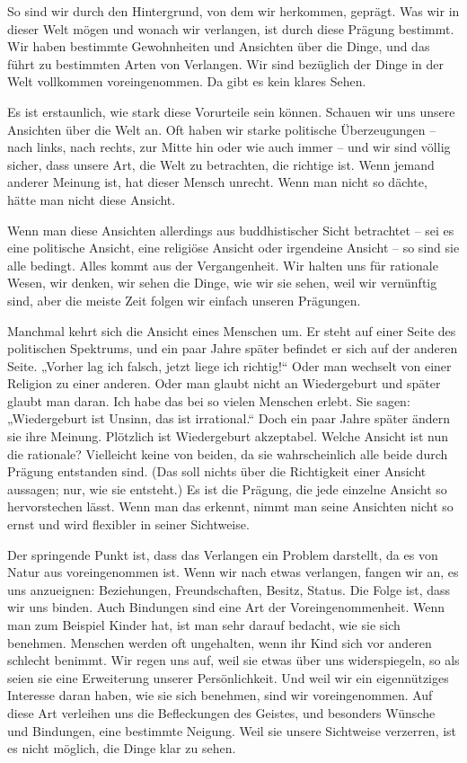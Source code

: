\documentclass[12pt,openany]{book}
\begin{document}
So sind wir durch den Hintergrund, von dem wir herkommen, geprägt. Was wir in dieser Welt mögen und wonach wir verlangen, ist durch diese Prägung bestimmt. Wir haben bestimmte Gewohnheiten und Ansichten über die Dinge, und das führt zu bestimmten Arten von Verlangen. Wir sind bezüglich der Dinge in der Welt vollkommen voreingenommen. Da gibt es kein klares Sehen.

Es ist erstaunlich, wie stark diese Vorurteile sein können. Schauen wir uns unsere Ansichten über die Welt an. Oft haben wir starke politische Überzeugungen – nach links, nach rechts, zur Mitte hin oder wie auch immer – und wir sind völlig sicher, dass unsere Art, die Welt zu betrachten, die richtige ist. Wenn jemand anderer Meinung ist, hat dieser Mensch unrecht. Wenn man nicht so dächte, hätte man nicht diese Ansicht.

Wenn man diese Ansichten allerdings aus buddhistischer Sicht betrachtet – sei es eine politische Ansicht, eine religiöse Ansicht oder irgendeine Ansicht – so sind sie alle bedingt. Alles kommt aus der Vergangenheit. Wir halten uns für rationale Wesen, wir denken, wir sehen die Dinge, wie wir sie sehen, weil wir vernünftig sind, aber die meiste Zeit folgen wir einfach unseren Prägungen.

Manchmal kehrt sich die Ansicht eines Menschen um. Er steht auf einer Seite des politischen Spektrums, und ein paar Jahre später befindet er sich auf der anderen Seite. „Vorher lag ich falsch, jetzt liege ich richtig!“ Oder man wechselt von einer Religion zu einer anderen. Oder man glaubt nicht an Wiedergeburt und später glaubt man daran. Ich habe das bei so vielen Menschen erlebt. Sie sagen: „Wiedergeburt ist Unsinn, das ist irrational.“ Doch ein paar Jahre später ändern sie ihre Meinung. Plötzlich ist Wiedergeburt akzeptabel. Welche Ansicht ist nun die rationale? Vielleicht keine von beiden, da sie wahrscheinlich alle beide durch Prägung entstanden sind. (Das soll nichts über die Richtigkeit einer Ansicht aussagen; nur, wie sie entsteht.) Es ist die Prägung, die jede einzelne Ansicht so hervorstechen lässt. Wenn man das erkennt, nimmt man seine Ansichten nicht so ernst und wird flexibler in seiner Sichtweise.

Der springende Punkt ist, dass das Verlangen ein Problem darstellt, da es von Natur aus voreingenommen ist. Wenn wir nach etwas verlangen, fangen wir an, es uns anzueignen: Beziehungen, Freundschaften, Besitz, Status. Die Folge ist, dass wir uns binden. Auch Bindungen sind eine Art der Voreingenommenheit. Wenn man zum Beispiel Kinder hat, ist man sehr darauf bedacht, wie sie sich benehmen. Menschen werden oft ungehalten, wenn ihr Kind sich vor anderen schlecht benimmt. Wir regen uns auf, weil sie etwas über uns widerspiegeln, so als seien sie eine Erweiterung unserer Persönlichkeit. Und weil wir ein eigennütziges Interesse daran haben, wie sie sich benehmen, sind wir voreingenommen. Auf diese Art verleihen uns die Befleckungen des Geistes, und besonders Wünsche und Bindungen, eine bestimmte Neigung. Weil sie unsere Sichtweise verzerren, ist es nicht möglich, die Dinge klar zu sehen.
\end{document}
